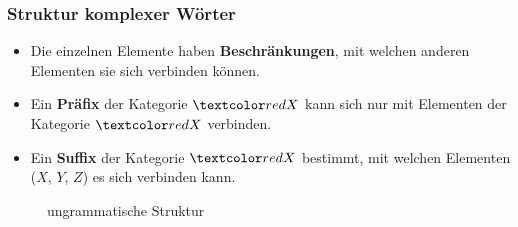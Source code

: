\begin{frame}
\frametitle{Struktur komplexer Wörter}

\begin{minipage}{.66\textwidth}

\begin{itemize}
	
	\item Die einzelnen Elemente haben \textbf{Beschränkungen}, mit welchen anderen Elementen sie sich verbinden können.

\pause 
	
	\item Ein \textbf{Präfix} der Kategorie $\alertred{X}$ kann sich nur mit Elementen der Kategorie $\alertred{X}$ verbinden.

	\z 	

	
	\item Ein \textbf{Suffix} der Kategorie $\alertred{X}$ bestimmt, mit welchen Elementen (\zB $X$, $Y$, $Z$) es sich verbinden kann.
	
	\z 
\end{itemize}

\end{minipage}
%
\hfill%
%
\begin{minipage}{.32\textwidth}

\begin{figure}	
\centering
{}
\caption{ungrammatische Struktur}
\end{figure}

\end{minipage}
\end{frame}


